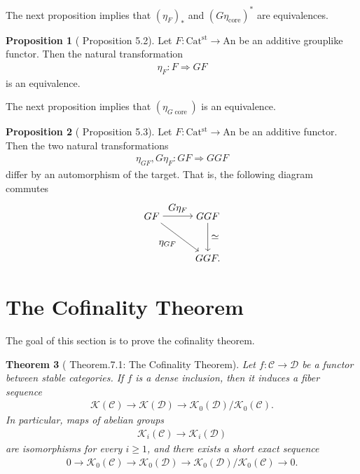 \documentclass[a4paper,dvipdfmx,11pt,reqno]{amsart}
\newcommand{\C}{\mathcal{C}}
\newcommand{\D}{\mathcal{D}}
\newcommand{\K}{\mathcal{K}}
\DeclareMathOperator{\core}{core}
\newcommand{\An}{\mathrm{An}}
\newcommand{\Catst}{\mathrm{Cat^{st}}}
\newtheorem{theorem}{Theorem}[section]
\theoremstyle{definition}
\newtheorem{proposition}[theorem]{Proposition}
\begin{document}
The next proposition implies that $(\eta_{F})_{\ast}$ and $(G\eta_{\core})^{\ast}$ are equivalences.

\begin{proposition}[\cite{HLS23} Proposition 5.2] \label{HLS23.prop.5.2}
  Let $F : \Catst \to \An$ be an additive grouplike functor.
  Then the natural transformation
  \begin{align*}
    \eta_{F} : F \Rightarrow GF
  \end{align*}
  is an equivalence. 
\end{proposition}

The next proposition implies that $(\eta_{G\core})$ is an equivalence.

\begin{proposition}[\cite{HLS23} Proposition 5.3] \label{HLS23.prop.5.3}
  Let $F : \Catst \to \An$ be an additive functor.
  Then the two natural transformations
  \begin{align*}
    \eta_{GF} , G\eta_{F} : GF \Rightarrow GGF
  \end{align*}
  differ by an automorphism of the target.
  That is, the following diagram commutes
  \[\begin{tikzpicture}[auto,->] 
    \node (tl) at (0,1.5) {$GF$}; 
    \node (tr) at (2,1.5) {$GGF$};
    \node (br) at (2,0) {$GGF.$}; 
    \draw (tl) -- node {$G\eta_{F}$} (tr); 
    \draw (tr) -- node {$\simeq$} (br); 
    \draw (tl) -- node[swap] {$\eta_{GF}$} (br);
  \end{tikzpicture}\] 
\end{proposition}


\section{The Cofinality Theorem}

The goal of this section is to prove the cofinality theorem.

\begin{theorem}[\cite{HLS23} Theorem.7.1: The Cofinality Theorem] \label{thrm.cofinality_theorem}
  Let $f : \C \to \D$ be a functor between stable categories.
  If $f$ is a dense inclusion, then it induces a fiber sequence
  \begin{align*}
    \K(\C) \to \K(\D) \to \K_0(\D)/\K_0(\C).
  \end{align*}
  In particular, maps of abelian groups
  \begin{align*}
    \K_i(\C) \to \K_i(\D)
  \end{align*}
  are isomorphisms for every $i \geq 1$, and there exists a short exact sequence 
  \begin{align*}
    0 \to \K_0(\C) \to \K_0(\D) \to \K_0(\D)/\K_0(\C) \to 0.
  \end{align*}
\end{theorem}
\end{document}
